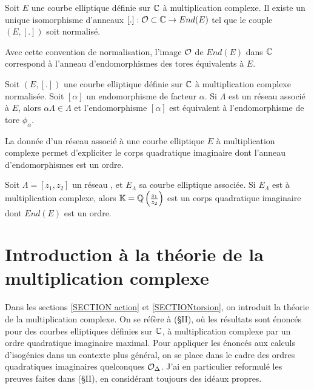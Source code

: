\begin{Prop}
	Soit $E$ une courbe elliptique définie sur $\mathbb{C}$ à multiplication complexe. Il existe un unique isomorphisme d'anneaux $[.] : \mathcal{O}\subset\mathbb{C}\rightarrow End(E)$ tel que le couple $(E,[.])$ soit normalisé.
\end{Prop}

Avec cette convention de normalisation, l'image $\mathcal{O}$ de $End(E)$ dans $\mathbb{C}$ correspond à l'anneau d'endomorphismes des tores équivalents à $E$.

\begin{Prop}
	Soit $(E,[.])$ une courbe elliptique définie sur $\mathbb{C}$ à multiplication complexe normalisée. Soit $[\alpha]$ un endomorphisme de facteur $\alpha$. Si $\Lambda$ est un réseau associé à $E$, alors $\alpha\Lambda\in\Lambda$ et l'endomorphisme $[\alpha]$ est équivalent à l'endomorphisme de tore $\phi_{\alpha}$.
\end{Prop}

La donnée d'un réseau associé à une courbe elliptique $E$ à multiplication complexe permet d'expliciter le corps quadratique imaginaire dont l'anneau d'endomorphismes est un ordre.

\begin{Prop}\label{lienRéseauCorps}
	
	Soit $\Lambda = \left[ z_{1}, z_{2}\right] $ un réseau , et $E_{\Lambda}$ sa courbe elliptique associée. Si $E_{\Lambda}$ est à multiplication complexe, alors $\mathbb{K} = \mathbb{Q}\left( \frac{z_1}{z_2}\right)$ est un corps quadratique imaginaire dont $End(E)$ est un ordre. 
\end{Prop}


\section{Introduction à la théorie de la multiplication complexe}\label{SECTION multiplicationComplexe}

Dans les sections \ref{SECTION action} et \ref{SECTIONtorsion}, on introduit la théorie de la multiplication complexe. On se réfère à \cite{Sil94}(\S II), où les résultats sont énoncés pour des courbes elliptiques définies sur $\mathbb{C}$, à multiplication complexe par un ordre quadratique imaginaire maximal. Pour appliquer les énoncés aux calculs d'isogénies dans un contexte plus général, on se place dans le cadre des ordres quadratiques imaginaires quelconques $\mathcal{O}_{\Delta}$. J'ai en particulier reformulé les preuves faites dans \cite{Sil94}(\S II), en considérant toujours des idéaux propres. 

